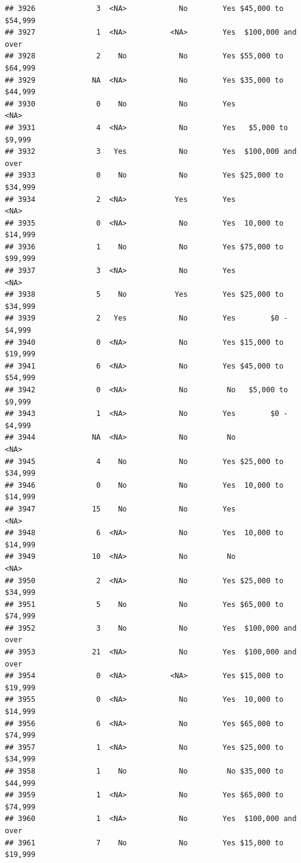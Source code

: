 \documentclass[man]{apa6}
\begin{document}
\begin{verbatim}
## 3926              3  <NA>            No        Yes $45,000 to $54,999
## 3927              1  <NA>          <NA>        Yes  $100,000 and over
## 3928              2    No            No        Yes $55,000 to $64,999
## 3929             NA  <NA>            No        Yes $35,000 to $44,999
## 3930              0    No            No        Yes               <NA>
## 3931              4  <NA>            No        Yes   $5,000 to $9,999
## 3932              3   Yes            No        Yes  $100,000 and over
## 3933              0    No            No        Yes $25,000 to $34,999
## 3934              2  <NA>           Yes        Yes               <NA>
## 3935              0  <NA>            No        Yes  10,000 to $14,999
## 3936              1    No            No        Yes $75,000 to $99,999
## 3937              3  <NA>            No        Yes               <NA>
## 3938              5    No           Yes        Yes $25,000 to $34,999
## 3939              2   Yes            No        Yes        $0 - $4,999
## 3940              0  <NA>            No        Yes $15,000 to $19,999
## 3941              6  <NA>            No        Yes $45,000 to $54,999
## 3942              0  <NA>            No         No   $5,000 to $9,999
## 3943              1  <NA>            No        Yes        $0 - $4,999
## 3944             NA  <NA>            No         No               <NA>
## 3945              4    No            No        Yes $25,000 to $34,999
## 3946              0    No            No        Yes  10,000 to $14,999
## 3947             15    No            No        Yes               <NA>
## 3948              6  <NA>            No        Yes  10,000 to $14,999
## 3949             10  <NA>            No         No               <NA>
## 3950              2  <NA>            No        Yes $25,000 to $34,999
## 3951              5    No            No        Yes $65,000 to $74,999
## 3952              3    No            No        Yes  $100,000 and over
## 3953             21  <NA>            No        Yes  $100,000 and over
## 3954              0  <NA>          <NA>        Yes $15,000 to $19,999
## 3955              0  <NA>            No        Yes  10,000 to $14,999
## 3956              6  <NA>            No        Yes $65,000 to $74,999
## 3957              1  <NA>            No        Yes $25,000 to $34,999
## 3958              1    No            No         No $35,000 to $44,999
## 3959              1  <NA>            No        Yes $65,000 to $74,999
## 3960              1  <NA>            No        Yes  $100,000 and over
## 3961              7    No            No        Yes $15,000 to $19,999

\end{verbatim}
\end{document}
